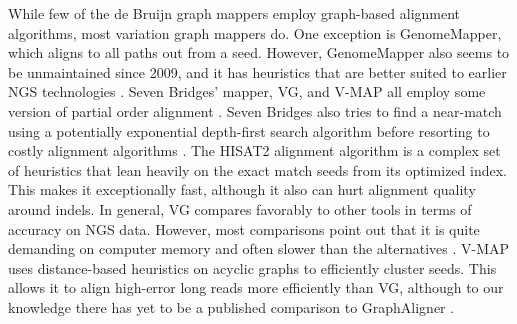 While few of the de Bruijn graph mappers employ graph-based alignment algorithms, most variation graph mappers do. 
One exception is GenomeMapper, which aligns to all paths out from a seed. 
However, GenomeMapper also seems to be unmaintained since 2009, and it has heuristics that are better suited to earlier NGS technologies \cite{Schneeberger_2009}. 
Seven Bridges' mapper, VG, and V-MAP all employ some version of partial order alignment \cite{Rakocevic_2019, Garrison_2019, Vaddadi_2019}. 
Seven Bridges also tries to find a near-match using a potentially exponential depth-first search algorithm before resorting to costly alignment algorithms \cite{Rakocevic_2019}. 
The HISAT2 alignment algorithm is a complex set of heuristics that lean heavily on the exact match seeds from its optimized index. 
This makes it exceptionally fast, although it also can hurt alignment quality around indels. 
In general, VG compares favorably to other tools in terms of accuracy on NGS data. However, most comparisons point out that it is quite demanding on computer memory and often slower than the alternatives \cite{Kim_2019, Vaddadi_2019}. 
V-MAP uses distance-based heuristics on acyclic graphs to efficiently cluster seeds. 
This allows it to align high-error long reads more efficiently than VG, although to our knowledge there has yet to be a published comparison to GraphAligner \cite{Vaddadi_2019}.


